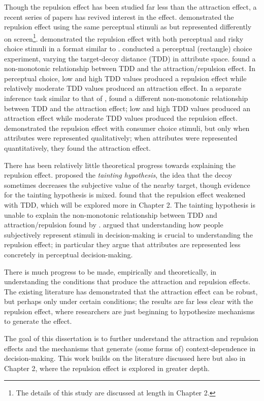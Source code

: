 Though the repulsion effect has been studied far less than the attraction effect, a recent series of papers has revived interest in the effect. \textcite{spektorWhenGoodLooks2018b} demonstrated the repulsion effect using the same perceptual stimuli as \textcite{trueblood2013not} but represented differently on screen\footnote{The details of this study are discussed at length in Chapter 2.}. \textcite{spektorRepulsionEffectPreferential2022} demonstrated the repulsion effect with both perceptual and risky choice stimuli in a format similar to \textcite{spektorWhenGoodLooks2018b}. \textcite{liaoInfluenceDistanceDecoy2021} conducted a perceptual (rectangle) choice experiment, varying the target-decoy distance (TDD) in attribute space. \textcite{liaoInfluenceDistanceDecoy2021} found a non-monotonic relationship between TDD and the attraction/repulsion effect. In perceptual choice, low and high TDD values produced a repulsion effect while relatively moderate TDD values produced an attraction effect. In a separate inference task similar to that of \textcite{truebloodMultialternativeContextEffects2012}, \textcite{liaoInfluenceDistanceDecoy2021} found a different non-monotonic relationship between TDD and the attraction effect; low and high TDD values produced an attraction effect while moderate TDD values produced the repulsion effect. \textcite{brendlPreferentialAttractionEffects2023} demonstrated the repulsion effect with consumer choice stimuli, but only when attributes were represented qualitatively; when attributes were represented quantitatively, they found the attraction effect.

There has been relatively little theoretical progress towards explaining the repulsion effect. \textcite{frederick2008attraction} proposed the \textit{tainting hypothesis}, the idea that the decoy sometimes decreases the subjective value of the nearby target, though evidence for the tainting hypothesis is mixed. \textcite{spektorWhenGoodLooks2018b} found that the repulsion effect weakened with TDD, which will be explored more in Chapter 2. The tainting hypothesis is unable to explain the non-monotonic relationship between TDD and attraction/repulsion found by \textcite{liaoInfluenceDistanceDecoy2021}. \textcite{spektorElusivenessContextEffects2021} argued that understanding how people subjectively represent stimuli in decision-making is crucial to understanding the repulsion effect; in particular they argue that attributes are represented less concretely in perceptual decision-making.

There is much progress to be made, empirically and theoretically, in understanding the conditions that produce the attraction and repulsion effects. The existing literature has demonstrated that the attraction effect can be robust, but perhaps only under certain conditions; the results are far less clear with the repulsion effect, where researchers are just beginning to hypothesize mechanisms to generate the effect. 

The goal of this dissertation is to further understand the attraction and repulsion effects and the mechanisms that generate (some forms of) context-dependence in decision-making. This work builds on the literature discussed here but also in Chapter 2, where the repulsion effect is explored in greater depth. 
 

